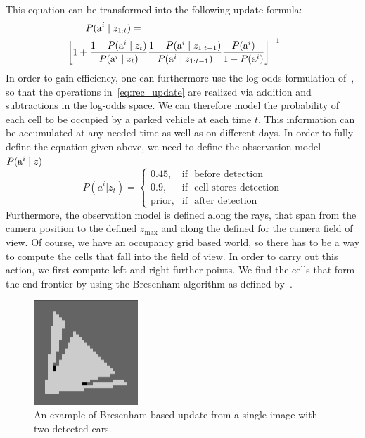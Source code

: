         \noindent
        This equation can be transformed into the following update formula:
        \begin{eqnarray}
        \label{eq:rec_update}
        \hspace{-6mm}\lefteqn{P(\v\mid z_{1:t})=} \nonumber \\
        && \hspace{-10mm} \left[ 1 + \frac{1 - P(\v\mid \z)}{P(\v \mid \z)}
           \frac{1 - P(\v \mid \y)}{P(\v \mid \y)}   \frac{P(\v)}{1 - P(\v)}  \right]^{-1}
        \end{eqnarray}
        \noindent
        In order to gain efficiency, one can furthermore use the log-odds formulation of~\cite{moravec1988}, so that the operations in~\eqref{eq:rec_update} are realized via addition and subtractions in the log-odds space.
        We can therefore model the probability of each cell to be occupied by a parked vehicle at each time $t$.
        This information can be accumulated at any needed time as well as on different days.
        In order to fully define the equation given above, we need to define the observation model $P({\mbox{a}^i} \mid z)$
        \begin{equation}
        \label{eq:observation_model}
            P(a^i | z_t) = \begin{cases} 0.45, & \mbox{if } \mbox{ before detection} \\ 0.9, & \mbox{if } \mbox{ cell stores detection} \\ \mbox{prior}, & \mbox{if } \mbox{ after detection} \end{cases}
        \end{equation}
        Furthermore, the observation model is defined along the rays, that span from the camera position to the defined $z_{\max}$ and along the defined for the camera field of view. Of course, we have an occupancy grid based world, so there has to be a way to compute the cells that fall into the field of view. In order to carry out this action, we first compute left and right further points. We find the cells that form the end frontier by using the Bresenham algorithm as defined by~\cite{bresenham1965}.
        \begin{figure}
            \begin{center}
                \includegraphics[width=0.35\textwidth]{pictures/testmap.png}
            \end{center}
            \vspace{-20pt}
            \caption{An example of Bresenham based update from a single image with two detected cars.}
            \vspace{-30pt}
            \label{fig:maptest}
        \end{figure}

